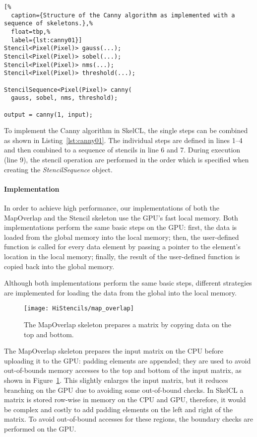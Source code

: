 \begin{lstlisting}[%
  caption={Structure of the Canny algorithm as implemented with a sequence of skeletons.},%
  float=tbp,%
  label={lst:canny01}]
Stencil<Pixel(Pixel)> gauss(...);
Stencil<Pixel(Pixel)> sobel(...);
Stencil<Pixel(Pixel)> nms(...);
Stencil<Pixel(Pixel)> threshold(...);

StencilSequence<Pixel(Pixel)> canny(
  gauss, sobel, nms, threshold);

output = canny(1, input);
\end{lstlisting}

To implement the Canny algorithm in SkelCL, the single steps can be combined as shown in Listing~\ref{lst:canny01}.
The individual steps are defined in lines 1--4 and then combined to a sequence of stencils in line 6 and 7.
During execution (line 9), the stencil operation are performed in the order which is specified when creating the \emph{StencilSequence} object.

\paragraph{Implementation}
In order to achieve high performance, our implementations of both the MapOverlap and the Stencil skeleton use the GPU's fast local memory.
Both implementations perform the same basic steps on the GPU:
first, the data is loaded from the global memory into the local memory;
then, the user-defined function is called for every data element by passing a pointer to the element's location in the local memory;
finally, the result of the user-defined function is copied back into the global memory.

Although both implementations perform the same basic steps, different strategies are implemented for loading the data from the global into the local memory.

\begin{figure}
  \begin{centering}
    \texttt{[image: HiStencils/map\_overlap]}
    \caption{The MapOverlap skeleton prepares a matrix by copying data on the top and bottom.}
    \label{fig:preparation}
    \vspace{-.5em}
  \end{centering}
\end{figure}

The MapOverlap skeleton prepares the input matrix on the CPU before uploading it to the GPU:
padding elements are appended; they are used to avoid out-of-bounds memory accesses to the top and bottom of the input matrix, as shown in Figure~\ref{fig:preparation}.
This slightly enlarges the input matrix, but it reduces branching on the GPU due to avoiding some out-of-bound checks.
In SkelCL a matrix is stored row-wise in memory on the CPU and GPU, therefore, it would be complex and costly to add padding elements on the left and right of the matrix.
To avoid out-of-bound accesses for these regions, the boundary checks are performed on the GPU.

